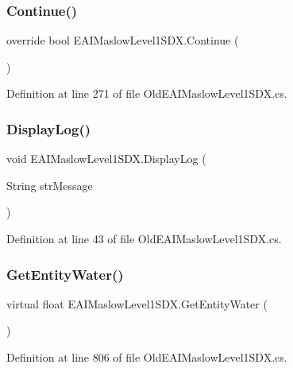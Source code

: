 \subsubsection{\texorpdfstring{Continue()}{Continue()}}
{\footnotesize\ttfamily override bool E\+A\+I\+Maslow\+Level1\+S\+D\+X.\+Continue (\begin{DoxyParamCaption}{ }\end{DoxyParamCaption})}



Definition at line 271 of file Old\+E\+A\+I\+Maslow\+Level1\+S\+D\+X.\+cs.

\mbox{\label{class_e_a_i_maslow_level1_s_d_x_a8eea2f5bdc585012edd193f3cc2910d2}} 
\subsubsection{\texorpdfstring{DisplayLog()}{DisplayLog()}}
{\footnotesize\ttfamily void E\+A\+I\+Maslow\+Level1\+S\+D\+X.\+Display\+Log (\begin{DoxyParamCaption}\item[{String}]{str\+Message }\end{DoxyParamCaption})}



Definition at line 43 of file Old\+E\+A\+I\+Maslow\+Level1\+S\+D\+X.\+cs.

\mbox{\label{class_e_a_i_maslow_level1_s_d_x_af8a547ba8337d59ef8679bb62fbb8164}} 
\subsubsection{\texorpdfstring{GetEntityWater()}{GetEntityWater()}}
{\footnotesize\ttfamily virtual float E\+A\+I\+Maslow\+Level1\+S\+D\+X.\+Get\+Entity\+Water (\begin{DoxyParamCaption}{ }\end{DoxyParamCaption})\hspace{0.3cm}{\ttfamily [virtual]}}



Definition at line 806 of file Old\+E\+A\+I\+Maslow\+Level1\+S\+D\+X.\+cs.

